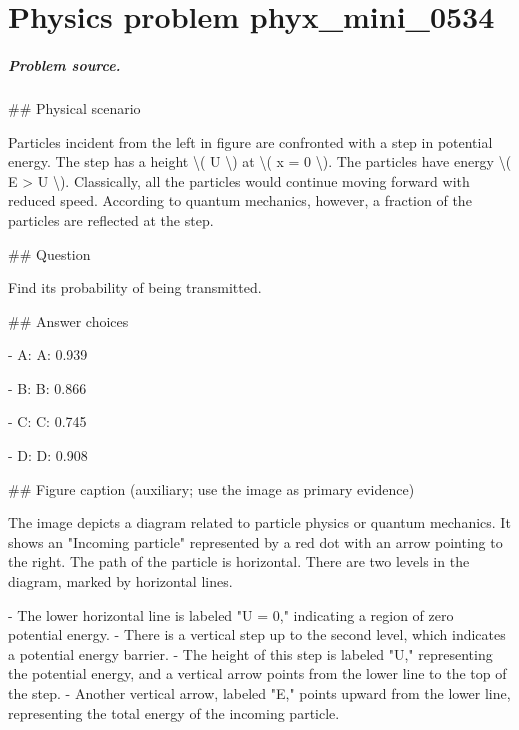 
\chapter{Physics problem phyx\_mini\_0534}
\label{ch:PhyXMiniProblems_problem_phyx_mini_0534}

\paragraph{Problem source.}
\#\# Physical scenario

Particles incident from the left in figure are confronted with a step in potential energy. The step has a height \textbackslash{}( U \textbackslash{}) at \textbackslash{}( x = 0 \textbackslash{}). The particles have energy \textbackslash{}( E > U \textbackslash{}). Classically, all the particles would continue moving forward with reduced speed. According to quantum mechanics, however, a fraction of the particles are reflected at the step.

\#\# Question

Find its probability of being transmitted.

\#\# Answer choices

- A: A: 0.939

- B: B: 0.866

- C: C: 0.745

- D: D: 0.908

\#\# Figure caption (auxiliary; use the image as primary evidence)

The image depicts a diagram related to particle physics or quantum mechanics. It shows an "Incoming particle" represented by a red dot with an arrow pointing to the right. The path of the particle is horizontal. There are two levels in the diagram, marked by horizontal lines. 

- The lower horizontal line is labeled "U = 0," indicating a region of zero potential energy.
- There is a vertical step up to the second level, which indicates a potential energy barrier.
- The height of this step is labeled "U," representing the potential energy, and a vertical arrow points from the lower line to the top of the step.
- Another vertical arrow, labeled "E," points upward from the lower line, representing the total energy of the incoming particle.


